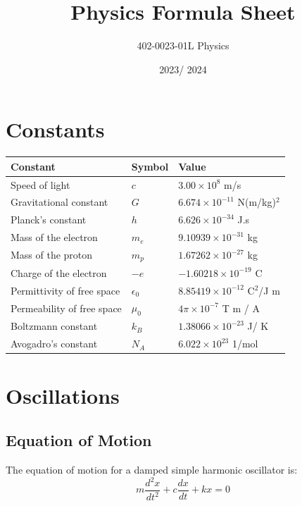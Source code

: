 \documentclass[12pt,a4paper]{article}
\title{Physics Formula Sheet}
\author{402-0023-01L  Physics}
\date{2023/ 2024}
\begin{document}
	\maketitle
	
	\section*{Constants}
	\begin{tabular}{lll}
		\toprule
		Constant & Symbol & Value \\
		\midrule
		Speed of light & \( c \) & \( 3.00 \times 10^8 \) m/s \\
		Gravitational constant & \( G \) & \( 6.674 \times 10^{-11} \) N(m/kg)\(^2\) \\
		Planck's constant & \( h \) & \( 6.626 \times 10^{-34} \) J.s \\
		Mass of the electron & \( m_e \) & \( 9.10939 \times 10^{-31} \) kg \\
		Mass of the proton & \( m_p \) & \( 1.67262 \times 10^{-27} \) kg \\
		Charge of the electron & \(-e\) & \(-1.60218 \times 10^{-19} \) C \\
		Permittivity of free space & \(\epsilon_0\) & \( 8.85419 \times 10^{-12} \) C\(^2\)/J m \\
		Permeability of free space & \(\mu_0\) & \( 4 \pi \times 10^{-7} \) T m / A \\
		Boltzmann constant & \( k_B \) & \( 1.38066 \times 10^{-23} \) J/ K \\
		Avogadro's constant & \( N_A \) & \( 6.022 \times 10^{23} \) 1/mol \\
		\bottomrule
	\end{tabular}
	
	\section*{Oscillations}
	\subsection*{Equation of Motion}
	The equation of motion for a damped simple harmonic oscillator is:
	\[
	m \frac{d^2 x}{dt^2} + c \frac{dx}{dt} + kx = 0
	\]
	
\end{document}
